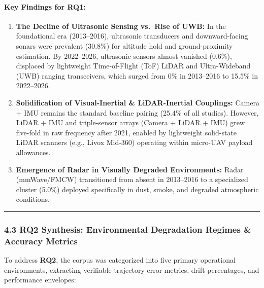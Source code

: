 \documentclass[journal]{IEEEtran}
\begin{document}
\paragraph{Key Findings for RQ1:}\label{key-findings-for-rq1}

\begin{enumerate}
\def\labelenumi{\arabic{enumi}.}
\tightlist
\item
  \textbf{The Decline of Ultrasonic Sensing vs.~Rise of UWB:} In the
  foundational era (2013--2016), ultrasonic transducers and
  downward-facing sonars were prevalent (30.8\%) for altitude hold and
  ground-proximity estimation. By 2022--2026, ultrasonic sensors almost
  vanished (0.6\%), displaced by lightweight Time-of-Flight (ToF) LiDAR
  and Ultra-Wideband (UWB) ranging transceivers, which surged from 0\%
  in 2013--2016 to 15.5\% in 2022--2026.
\item
  \textbf{Solidification of Visual-Inertial \& LiDAR-Inertial
  Couplings:} Camera + IMU remains the standard baseline pairing (25.4\%
  of all studies). However, LiDAR + IMU and triple-sensor arrays (Camera
  + LiDAR + IMU) grew five-fold in raw frequency after 2021, enabled by
  lightweight solid-state LiDAR scanners (e.g., Livox Mid-360) operating
  within micro-UAV payload allowances.
\item
  \textbf{Emergence of Radar in Visually Degraded Environments:} Radar
  (mmWave/FMCW) transitioned from absent in 2013--2016 to a specialized
  cluster (5.0\%) deployed specifically in dust, smoke, and degraded
  atmospheric conditions.
\end{enumerate}

\begin{center}\rule{0.5\linewidth}{0.5pt}\end{center}

\subsubsection{4.3 RQ2 Synthesis: Environmental Degradation Regimes \&
Accuracy
Metrics}\label{rq2-synthesis-environmental-degradation-regimes-accuracy-metrics}

To address \textbf{RQ2}, the corpus was categorized into five primary
operational environments, extracting verifiable trajectory error
metrics, drift percentages, and performance envelopes:
\end{document}
